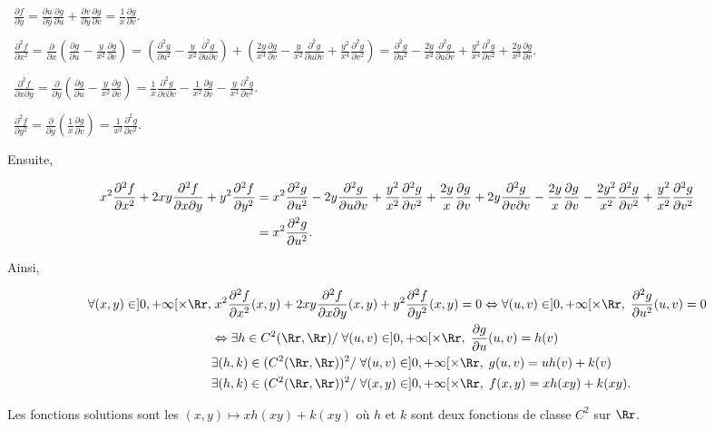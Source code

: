 {\begin{enumerate}
{\textbullet~$ \frac{\partial f}{\partial y}= \frac{\partial u}{\partial y} \frac{\partial g}{\partial u}+ \frac{\partial v}{\partial y} \frac{\partial g}{\partial v}= \frac{1}{x} \frac{\partial g}{\partial v}$.

\textbullet~$ \frac{\partial^2f}{\partial x^2}= \frac{\partial}{\partial x}\left( \frac{\partial g}{\partial u}- \frac{y}{x^2} \frac{\partial g}{\partial v}\right)=\left( \frac{\partial^2g}{\partial u^2}- \frac{y}{x^2} \frac{\partial^2g}{\partial u\partial v}\right)+\left( \frac{2y}{x^3} \frac{\partial g}{\partial v}- \frac{y}{x^2} \frac{\partial^2g}{\partial u\partial v}+ \frac{y^2}{x^4} \frac{\partial^2g}{\partial v^2}\right)= \frac{\partial^2g}{\partial u^2}- \frac{2y}{x^2} \frac{\partial^2g}{\partial u\partial v}+ \frac{y^2}{x^4} \frac{\partial^2g}{\partial v^2}+ \frac{2y}{x^3} \frac{\partial g}{\partial v}$.

\textbullet~$ \frac{\partial^2f}{\partial x\partial y}= \frac{\partial}{\partial y}\left( \frac{\partial g}{\partial u}- \frac{y}{x^2} \frac{\partial g}{\partial v}\right)= \frac{1}{x} \frac{\partial^2g}{\partial v\partial  v}- \frac{1}{x^2} \frac{\partial g}{\partial v}- \frac{y}{x^3} \frac{\partial^2g}{\partial v^2}$.

\textbullet~$ \frac{\partial^2f}{\partial y^2}= \frac{\partial}{\partial y}\left( \frac{1}{x} \frac{\partial g}{\partial v}\right)= \frac{1}{x^2} \frac{\partial^2g}{\partial v^2}$.

Ensuite,

\begin{align*}\ensuremath
x^2 \frac{\partial^2f}{\partial x^2}+2xy \frac{\partial^2f}{\partial x\partial y}+y^2 \frac{\partial^2f}{\partial y^2}&=x^2 \frac{\partial^2g}{\partial u^2}-2y \frac{\partial^2g}{\partial u\partial v}+ \frac{y^2}{x^2} \frac{\partial^2g}{\partial v^2}+ \frac{2y}{x} \frac{\partial g}{\partial v}+2y \frac{\partial^2g}{\partial v\partial  v}- \frac{2y}{x} \frac{\partial g}{\partial v}- \frac{2y^2}{x^2} \frac{\partial^2g}{\partial v^2}+ \frac{y^2}{x^2} \frac{\partial^2g}{\partial v^2}\\
 &=x^2 \frac{\partial^2g}{\partial u^2}.
\end{align*}

Ainsi,

\begin{align*}\ensuremath
\forall(x,y)\in]0,+\infty[\times\Rr,&\;x^2 \frac{\partial^2f}{\partial x^2}(x,y)+2xy \frac{\partial^2f}{\partial x\partial y}(x,y)+y^2 \frac{\partial^2f}{\partial y^2}(x,y)=0\Leftrightarrow\forall(u,v)\in]0,+\infty[\times\Rr,\; \frac{\partial^2g}{\partial u^2}(u,v)=0\\
 &\Leftrightarrow\exists h\in C^2(\Rr,\Rr)/\;\forall(u,v)\in]0,+\infty[\times\Rr,\; \frac{\partial g}{\partial u}(u,v)=h(v)\\
  &\exists(h,k)\in(C^2(\Rr,\Rr))^2/\;\forall(u,v)\in]0,+\infty[\times\Rr,\;g(u,v)=uh(v)+k(v)\\
  &\exists(h,k)\in(C^2(\Rr,\Rr))^2/\;\forall(x,y)\in]0,+\infty[\times\Rr,\;f(x,y)=xh(xy)+k(xy).
\end{align*}

Les fonctions solutions sont les $(x,y)\mapsto xh(xy)+k(xy)$ où $h$ et $k$ sont deux fonctions de classe $C^2$ sur $\Rr$.}
\end{enumerate}
}